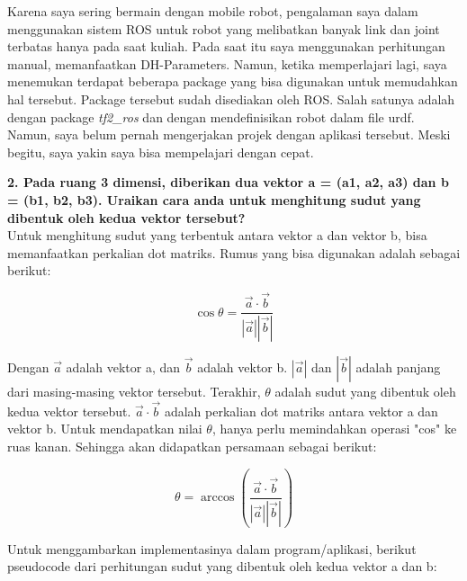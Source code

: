 \documentclass[a4paper,12pt]{article}
\begin{document}
Karena saya sering bermain dengan mobile robot, pengalaman saya dalam menggunakan sistem ROS untuk robot yang melibatkan banyak link dan joint terbatas hanya pada saat kuliah. Pada saat itu saya menggunakan perhitungan manual, memanfaatkan DH-Parameters. Namun, ketika memperlajari lagi, saya menemukan terdapat beberapa package yang bisa digunakan untuk memudahkan hal tersebut. Package tersebut sudah disediakan oleh ROS. Salah satunya adalah dengan package \textit{tf2\_ros} dan dengan mendefinisikan robot dalam file urdf. Namun, saya belum pernah mengerjakan projek dengan aplikasi tersebut. Meski begitu, saya yakin saya bisa mempelajari dengan cepat.


\textbf{2. Pada ruang 3 dimensi, diberikan dua vektor a = (a1, a2, a3) dan b = (b1, b2, b3). Uraikan cara anda untuk menghitung sudut yang dibentuk oleh kedua vektor tersebut?}\\

Untuk menghitung sudut yang terbentuk antara vektor a dan vektor b, bisa memanfaatkan perkalian dot matriks. Rumus yang bisa digunakan adalah sebagai berikut:

\begin{equation}
    \cos \theta = \frac{\vec{a} \cdot \vec{b}}{|\vec{a}||\vec{b}|}
\end{equation}

Dengan $\vec{a}$ adalah vektor a, dan $\vec{b}$ adalah vektor b. $|\vec{a}|$ dan $|\vec{b}|$ adalah panjang dari masing-masing vektor tersebut. Terakhir, $\theta$ adalah sudut yang dibentuk oleh kedua vektor tersebut. $\vec{a} \cdot \vec{b}$ adalah perkalian dot matriks antara vektor a dan vektor b. Untuk mendapatkan nilai $\theta$, hanya perlu memindahkan operasi "cos" ke ruas kanan. Sehingga akan didapatkan persamaan sebagai berikut:

\begin{equation}
    \theta = \arccos \left( \frac{\vec{a} \cdot \vec{b}}{|\vec{a}||\vec{b}|} \right)
\end{equation}

Untuk menggambarkan implementasinya dalam program/aplikasi, berikut pseudocode dari perhitungan sudut yang dibentuk oleh kedua vektor a dan b:
\end{document}
